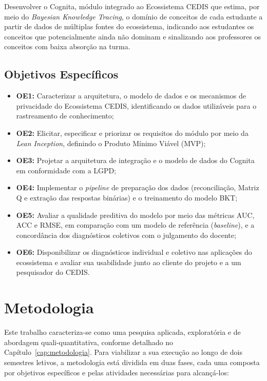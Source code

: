 Desenvolver o Cognita, módulo integrado ao Ecossistema CEDIS que estima, por meio do \textit{Bayesian Knowledge Tracing}, o domínio de conceitos de cada estudante a partir de dados de múltiplas fontes do ecossistema, indicando aos estudantes os conceitos que potencialmente ainda não dominam e sinalizando aos professores os conceitos com baixa absorção na turma.

\subsection{Objetivos Específicos}
\label{subsec:objetivos-especificos}

\begin{itemize}
    \item \textbf{OE1:} Caracterizar a arquitetura, o modelo de dados e os mecanismos de privacidade do Ecossistema CEDIS, identificando os dados utilizáveis para o rastreamento de conhecimento;
    \item \textbf{OE2:} Elicitar, especificar e priorizar os requisitos do módulo por meio da \textit{Lean Inception}, definindo o Produto Mínimo Viável (MVP);
    \item \textbf{OE3:} Projetar a arquitetura de integração e o modelo de dados do Cognita em conformidade com a LGPD;
    \item \textbf{OE4:} Implementar o \textit{pipeline} de preparação dos dados (reconciliação, Matriz Q e extração das respostas binárias) e o treinamento do modelo BKT;
    \item \textbf{OE5:} Avaliar a qualidade preditiva do modelo por meio das métricas AUC, ACC e RMSE, em comparação com um modelo de referência (\textit{baseline}), e a concordância dos diagnósticos coletivos com o julgamento do docente;
    \item \textbf{OE6:} Disponibilizar os diagnósticos individual e coletivo nas aplicações do ecossistema e avaliar sua usabilidade junto ao cliente do projeto e a um pesquisador do CEDIS.
\end{itemize}

\section{Metodologia}
\label{sec:metodologia}

Este trabalho caracteriza-se como uma pesquisa aplicada, exploratória e de abordagem quali-quantitativa, conforme detalhado no Capítulo~\ref{cap:metodologia}. Para viabilizar a sua execução ao longo de dois semestres letivos, a metodologia está dividida em duas fases, cada uma composta por objetivos específicos e pelas atividades necessárias para alcançá-los:


